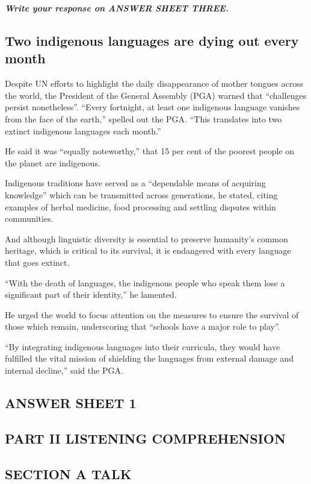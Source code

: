 \documentclass[UTF8,11pt]{ctexart}
\begin{document}
\textbf{\textit{Write your response on ANSWER SHEET THREE.}}


\subsection*{\textbf{Two indigenous languages are dying out every month}}


Despite UN efforts to highlight the daily disappearance of mother tongues across the world, the President of the General Assembly (PGA) warned that “challenges persist nonetheless”. “Every fortnight, at least one indigenous language vanishes from the face of the earth,” spelled out the PGA. “This translates into two extinct indigenous languages each month.”


He said it was “equally noteworthy,” that 15 per cent of the poorest people on the planet are indigenous.


Indigenous traditions have served as a “dependable means of acquiring knowledge” which can be transmitted across generations, he stated, citing examples of herbal medicine, food processing and settling disputes within communities.


And although linguistic diversity is essential to preserve humanity’s common heritage, which is critical to its survival, it is endangered with every language that goes extinct.


“With the death of languages, the indigenous people who speak them lose a significant part of their identity,” he lamented.


He urged the world to focus attention on the measures to ensure the survival of those which remain, underscoring that “schools have a major role to play”.


“By integrating indigenous languages into their curricula, they would have fulfilled the vital mission of shielding the languages from external damage and internal decline,” said the PGA.


\subsection*{\textbf{ANSWER SHEET 1}}


\subsection*{\textbf{PART II LISTENING COMPREHENSION}}


\subsection*{\textbf{SECTION A TALK}}
\end{document}
